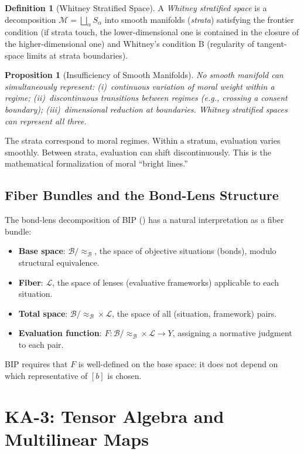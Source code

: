 \documentclass[12pt,letterpaper]{article}
\newtheorem{proposition}[theorem]{Proposition}
\theoremstyle{definition}
\newtheorem{definition}[theorem]{Definition}
\theoremstyle{plain}
\newcommand{\calB}{\mathcal{B}}
\newcommand{\calL}{\mathcal{L}}
\newcommand{\calM}{\mathcal{M}}
\newcommand{\equivB}{\approx_{\mathcal{B}}}
\begin{document}
\begin{definition}[Whitney Stratified Space]
A \emph{Whitney stratified space} is a decomposition $\calM = \bigsqcup_\alpha S_\alpha$ into smooth manifolds (\emph{strata}) satisfying the frontier condition (if strata touch, the lower-dimensional one is contained in the closure of the higher-dimensional one) and Whitney's condition B (regularity of tangent-space limits at strata boundaries).
\end{definition}

\begin{proposition}[Insufficiency of Smooth Manifolds]
No smooth manifold can simultaneously represent: (i)~continuous variation of moral weight within a regime; (ii)~discontinuous transitions between regimes (e.g., crossing a consent boundary); (iii)~dimensional reduction at boundaries. Whitney stratified spaces can represent all three.
\end{proposition}

The strata correspond to moral regimes. Within a stratum, evaluation varies smoothly. Between strata, evaluation can shift discontinuously. This is the mathematical formalization of moral ``bright lines.''

\subsection{Fiber Bundles and the Bond-Lens Structure}

The bond-lens decomposition of BIP () has a natural interpretation as a fiber bundle:
\begin{itemize}
    \item \textbf{Base space}: $\calB / \equivB$, the space of objective situations (bonds), modulo structural equivalence.
    \item \textbf{Fiber}: $\calL$, the space of lenses (evaluative frameworks) applicable to each situation.
    \item \textbf{Total space}: $\calB / \equivB \times \calL$, the space of all (situation, framework) pairs.
    \item \textbf{Evaluation function}: $F: \calB / \equivB \times \calL \to Y$, assigning a normative judgment to each pair.
\end{itemize}
BIP requires that $F$ is well-defined on the base space: it does not depend on which representative of $[b]$ is chosen.


\section{KA-3: Tensor Algebra and Multilinear Maps}
\label{sec:ka3}
\end{document}

